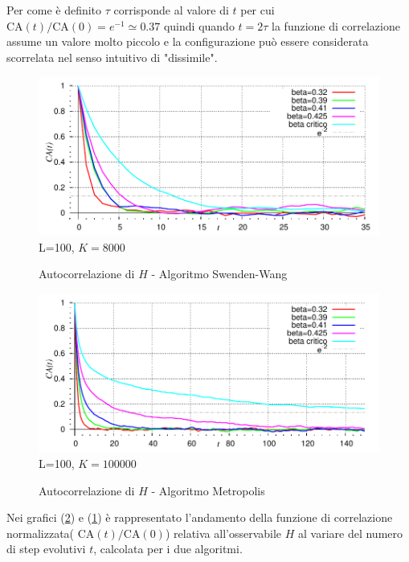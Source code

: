 Per come è definito $\tau$ corrisponde al valore di $t$ per cui $\textrm{CA}(t)/\textrm{CA}(0) = e^{-1} \simeq 0.37$ quindi quando $t = 2\tau$ la funzione di correlazione assume un valore molto piccolo e la configurazione può essere considerata scorrelata nel senso intuitivo di "dissimile".
\begin{figure}[!h]
\centering
\caption[ParteB$\_$Autocorrelazione$\_$CAvst$\_$Cluster.cpp ]{Autocorrelazione di $H$ - Algoritmo Swenden-Wang }\label{fig: Cluster_CAvst}
\includegraphics[scale=0.75]{Immagini/ParteB/Cluster_CAvst}
\newline \footnotesize L=100, $K = 8000$
\end{figure}
\begin{figure}[!h]
\centering
\caption[ParteB$\_$Autocorrelazione$\_$CAvst$\_$Metro.cpp ]{Autocorrelazione di $H$ - Algoritmo Metropolis }\label{fig: Metro_CAvst}
\includegraphics[scale=0.75]{Immagini/ParteB/Metro_CAvst}
\newline \footnotesize L=100, $K = 100000$
\end{figure}
\newline
Nei grafici (\ref{fig: Metro_CAvst}) e (\ref{fig: Cluster_CAvst}) è rappresentato l'andamento della funzione di correlazione normalizzata( $\textrm{CA}(t)/\textrm{CA}(0)$) relativa all'osservabile $H$ al variare del numero di step evolutivi $t$, calcolata per i due algoritmi.\newline
